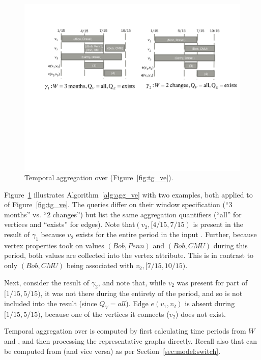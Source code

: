\begin{figure}
\includegraphics[width=5in]{figs/agg.pdf}
\caption{Temporal aggregation over  (Figure~\ref{fig:tg_ve}).}
\label{fig:tg_agg}
\end{figure}

Figure~\ref{fig:tg_agg} illustrates Algorithm~\ref{alg:agg_ve} with
two examples, both applied to  of Figure~\ref{fig:tg_ve}.
The queries differ on their window specification (``3 months'' vs. ``2
changes'') but list the same aggregation quantifiers (``all'' for
vertices and ``exists'' for edges).  Note that$(v_2, [4/15, 7/15)$ is
  present in the result of $\gamma_1$ because $v_2$ exists for the
  entire period in the input .  Further, because vertex
  properties took on values $(Bob, Penn)$ and $(Bob, CMU)$ during this
  period, both values are collected into the vertex attribute.  This
  is in contrast to only $(Bob, CMU)$ being associated with $v_2,
  [7/15, 10/15)$.

Next, consider the result of $\gamma_2$, and note that, while $v_2$
was present for part of $[1/15, 5/15)$, it was not there during the
  entirety of the period, and so is not included into the result
  (since $Q_V=all$).  Edge $e(v_1, v_2)$ is absent during $[1/15,
    5/15)$, because one of the vertices it connects ($v_2$) does not
    exist.

Temporal aggregation over \trg is computed by first calculating time
periods from $W$ and \trg, and then processing the representative
graphs directly.  Recall also that \trg can be computed from \tve (and
vice versa) as per Section~\ref{sec:model:switch}.

